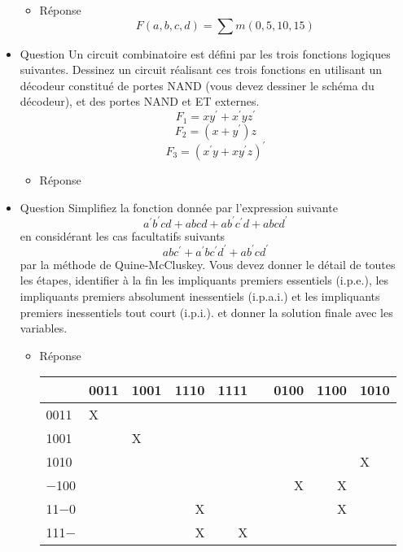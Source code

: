 \documentclass[letter, oneside]{book}
\begin{document}
\begin{itemize}
\begin{center}

\end{center}

\begin{itemize}
\item Réponse
\label{sec:orgd515c14}
$$
F (a, b, c, d)= \sum m(0, 5, 10, 15)
$$
\end{itemize}

\item Question
\label{sec:org2c6385d}
Un circuit combinatoire est défini par les trois fonctions logiques
suivantes. Dessinez un circuit réalisant ces trois fonctions en
utilisant un décodeur constitué de portes NAND (vous devez dessiner
le schéma du décodeur), et des portes NAND et ET
externes.
$$
F_1 = x y^{\prime} + x^{\prime}y z^{\prime} 
$$
$$
F_2 = (x + y^{\prime})z 
$$
$$F_3 = (x^{\prime} y + x y^{\prime} z)^{\prime}
$$

\begin{itemize}
\item Réponse
\label{sec:org12fed06}

\begin{center}

\end{center}
\end{itemize}

\item Question
\label{sec:org5b715c5}
Simplifiez la fonction donnée par l'expression suivante
$$
a^{\prime} b^{\prime} c d + a b c d + a b^{\prime} c^{\prime} d +
	a b c d^{\prime}
$$
en considérant les cas facultatifs suivants
$$
a b c^{\prime} + a^{\prime} b c^{\prime} d^{\prime} + a b^{\prime}
	c d^{\prime}
$$
par la méthode de Quine-McCluskey. Vous devez
donner le détail de toutes les étapes, identifier à la fin les
impliquants premiers essentiels (i.p.e.), les impliquants premiers
absolument inessentiels (i.p.a.i.) et les impliquants premiers
inessentiels tout court (i.p.i.). et donner la solution finale avec
les variables.

\begin{itemize}
\item Réponse
\label{sec:orgaf72313}

\begin{center}
\begin{tabular}{lllrrlrrl}
 & 0011 & 1001 & 1110 & 1111 &  & 0100 & 1100 & 1010\\[0pt]
\hline
0011 & X &  &  &  &  &  &  & \\[0pt]
1001 &  & X &  &  &  &  &  & \\[0pt]
1010 &  &  &  &  &  &  &  & X\\[0pt]
−100 &  &  &  &  &  & X & X & \\[0pt]
11−0 &  &  & X &  &  &  & X & \\[0pt]
111− &  &  & X & X &  &  &  & \\[0pt]
\end{tabular}
\end{center}


\end{itemize}
\end{itemize}
\end{document}
